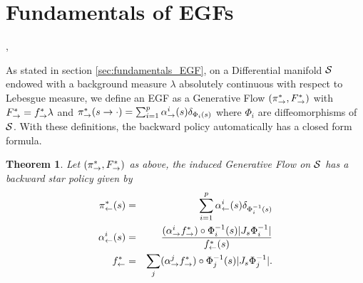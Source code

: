 \documentclass{article}
\theoremstyle{plain}
\newtheorem{theorem}{Theorem}[section]
\theoremstyle{definition}
\theoremstyle{remark}
\theoremstyle{fact}
\begin{document}
\section{Fundamentals of EGFs} \label{sec:appendix_backward},

As stated in section \ref{sec:fundamentals_EGF}, on a Differential manifold $\mathcal S$ endowed with a background measure $\lambda$ absolutely continuous with respect to Lebesgue measure, we define an EGF as a Generative Flow  $(\pi_{\rightarrow}^*, F^*_{\rightarrow})$ with 
$F^*_{\rightarrow} = f^*_{\rightarrow} \lambda$ and $\pi_{\rightarrow}^*(s\rightarrow \cdot) = \sum_{i=1}^p\alpha_{\rightarrow}^{i}(s)\delta_{\Phi_i(s)}$ where $\Phi_i$ are diffeomorphisms of $\mathcal S$.  With these definitions, the backward policy automatically has a closed form formula.
\begin{theorem} Let $(\pi_{\rightarrow}^*,F^*_{\rightarrow})$ as above, the induced Generative Flow  on $\mathcal S$ has a backward star policy given by  
    \begin{eqnarray}\label{equ:tractable_inflow_appendix}
\pi_{\leftarrow}^*(s) &=& \sum_{i=1}^p\alpha_{\leftarrow}^i(s) \delta_{\Phi_i^{-1}(s)} \\ 
\alpha_{\leftarrow}^i(s) &=& \frac{(\alpha_{\rightarrow}^if^*_\rightarrow)\circ \Phi_i^{-1}(s)|J_s {\Phi_i^{-1}}| }{ f^*_{\leftarrow}(s)} \\
f^*_{\leftarrow} &=&  \sum_j (\alpha_{\rightarrow}^jf^*_\rightarrow)\circ \Phi_j^{-1}(s) |J_s {\Phi_j^{-1}}|.
\end{eqnarray}
\end{theorem}
\end{document}
